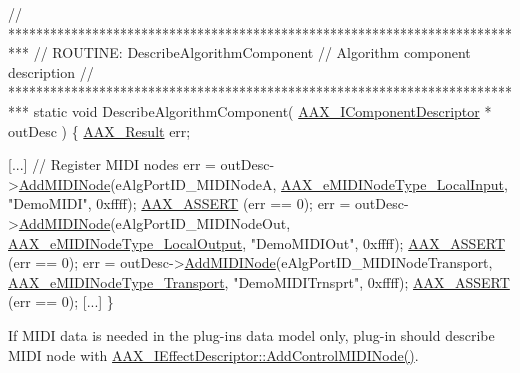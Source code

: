 \begin{DoxyCode}
\textcolor{comment}{// ***************************************************************************}
\textcolor{comment}{// ROUTINE: DescribeAlgorithmComponent}
\textcolor{comment}{// Algorithm component description}
\textcolor{comment}{// ***************************************************************************}
\textcolor{keyword}{static} \textcolor{keywordtype}{void} DescribeAlgorithmComponent( \hyperlink{a00088}{AAX\_IComponentDescriptor} * outDesc )
\{
    \hyperlink{a00149_a4d8f69a697df7f70c3a8e9b8ee130d2f}{AAX\_Result}                    err;
    
    [...]
    \textcolor{comment}{// Register MIDI nodes}
    err = outDesc->\hyperlink{a00088_a6284dda9ccca898e33075de29dad4e39}{AddMIDINode}(eAlgPortID\_MIDINodeA, 
      \hyperlink{a00206_a5e1dffce35d05990dbbad651702678e4ae57de2b04978fe2e75f5bdeb034bda44}{AAX\_eMIDINodeType\_LocalInput}, \textcolor{stringliteral}{"DemoMIDI"}, 0xffff);                  
      \hyperlink{a00158_a168ee44fd7a5485ab50160db36fb2988}{AAX\_ASSERT} (err == 0);
    err = outDesc->\hyperlink{a00088_a6284dda9ccca898e33075de29dad4e39}{AddMIDINode}(eAlgPortID\_MIDINodeOut, 
      \hyperlink{a00206_a5e1dffce35d05990dbbad651702678e4acc1b5f2109c508b20a65b5e0fdcd643f}{AAX\_eMIDINodeType\_LocalOutput}, \textcolor{stringliteral}{"DemoMIDIOut"}, 0xffff);         
      \hyperlink{a00158_a168ee44fd7a5485ab50160db36fb2988}{AAX\_ASSERT} (err == 0);
    err = outDesc->\hyperlink{a00088_a6284dda9ccca898e33075de29dad4e39}{AddMIDINode}(eAlgPortID\_MIDINodeTransport, 
      \hyperlink{a00206_a5e1dffce35d05990dbbad651702678e4ac2ff856aec0724907dfd95b8e3ccbc20}{AAX\_eMIDINodeType\_Transport}, \textcolor{stringliteral}{"DemoMIDITrnsprt"}, 0xffff); 
      \hyperlink{a00158_a168ee44fd7a5485ab50160db36fb2988}{AAX\_ASSERT} (err == 0);
    [...]
\}
\end{DoxyCode}


If M\+I\+D\+I data is needed in the plug-\/in\textquotesingle{}s data model only, plug-\/in should describe M\+I\+D\+I node with \hyperlink{a00096_aa7709de005e0256feb522758ccc5b582}{A\+A\+X\+\_\+\+I\+Effect\+Descriptor\+::\+Add\+Control\+M\+I\+D\+I\+Node()}.


